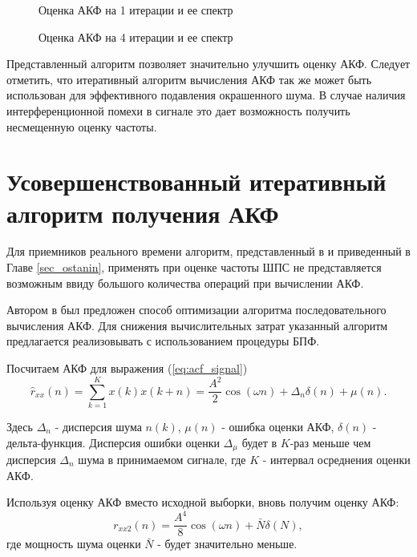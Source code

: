\begin{figure}[h]
	\center{}
	\caption{Оценка АКФ на 1 итерации и ее спектр}
	\label{pic:acf_1_iter}
\end{figure}

\begin{figure}[h]
	\center{}
	\caption{Оценка АКФ на 4 итерации и ее спектр}
	\label{pic:acf_4_iter}
\end{figure}

Представленный алгоритм позволяет значительно улучшить оценку АКФ. Следует отметить, что итеративный алгоритм вычисления АКФ так же
может быть использован для эффективного подавления окрашенного шума. В случае наличия интерференционной помехи в сигнале это дает
возможность получить несмещенную оценку частоты.

\section{Усовершенствованный итеративный алгоритм получения АКФ}
\label{sec_acf_fft}
Для приемников реального времени алгоритм, представленный в \cite{ostanin_akf} и приведенный в Главе \ref{sec_ostanin}, применять при оценке 
частоты ШПС не представляется возможным ввиду большого количества операций при вычислении АКФ.

Автором в \cite{my_acf} был предложен способ оптимизации алгоритма последовательного вычисления АКФ.
Для снижения вычислительных затрат указанный алгоритм предлагается реализовывать с использованием процедуры БПФ. 

Посчитаем АКФ для выражения (\ref{eq:acf_signal})
\begin{equation}
	\label{eq:lpc_akf_n}
	\hat{r}_{xx}(n) = \sum \limits_{k=1}^{K} x(k)x(k+n) = \frac{A^2}{2} \cos{(\omega{n})} + \Delta_n \delta{(n)} + \mu{(n)}.
\end{equation}

Здесь ${\Delta_n}$ - дисперсия шума ${n(k)}$, ${\mu{(n)}}$ - ошибка оценки АКФ, ${\delta{(n)}}$ - дельта-функция. Дисперсия ошибки
оценки ${\Delta_{\mu}}$ будет в ${K}$-раз меньше чем дисперсия ${\Delta_n}$ шума в принимаемом сигнале, где ${K}$ - интервал
осреднения оценки АКФ.

Используя оценку АКФ вместо исходной выборки, вновь получим оценку АКФ:
\begin{equation}
	r_{xx2}(n) = \frac{A^4}{8} \cos{(\omega n)} + \bar{N} \delta{(N)},
\end{equation}
где мощность шума оценки ${\bar{N}}$ - будет значительно меньше.

